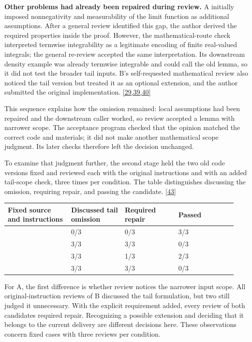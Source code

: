 \textbf{Other problems had already been repaired during review.} A initially imposed nonnegativity and measurability of the limit function as additional assumptions. After a general review identified this gap, the author derived the required properties inside the proof. However, the mathematical-route check interpreted termwise integrability as a legitimate encoding of finite real-valued integrals; the general re-review accepted the same interpretation. Its downstream density example was already termwise integrable and could call the old lemma, so it did not test the broader tail inputs. B's self-requested mathematical review also noticed the tail version but treated it as an optional extension, and the author submitted the original implementation. \hyperlink{ref-29}{\mbox{[29,39,40]}}

This sequence explains how the omission remained: local assumptions had been repaired and the downstream caller worked, so review accepted a lemma with narrower scope. The acceptance program checked that the opinion matched the correct code and materials; it did not make another mathematical scope judgment. Its later checks therefore left the decision unchanged.

To examine that judgment further, the second stage held the two old code versions fixed and reviewed each with the original instructions and with an added tail-scope check, three times per condition. The table distinguishes discussing the omission, requiring repair, and passing the candidate. \hyperlink{ref-43}{\mbox{[43]}}

\begingroup\small\setlength{\tabcolsep}{3pt}\renewcommand{\arraystretch}{1.14}
\par\nopagebreak\medskip\noindent\begin{minipage}[t]{\linewidth}
\begin{tabular}{>{\raggedright\arraybackslash}p{0.26\linewidth}>{\raggedright\arraybackslash}p{0.22\linewidth}>{\raggedright\arraybackslash}p{0.22\linewidth}>{\raggedright\arraybackslash}p{0.24\linewidth}}
\toprule
\textbf{Fixed source and instructions} & \textbf{Discussed tail omission} & \textbf{Required repair} & \textbf{Passed}\\\midrule

{A, original instructions} & {0/3} & {0/3} & {3/3}\\
{A, added scope check} & {3/3} & {3/3} & {0/3}\\
{B, original instructions} & {3/3} & {1/3} & {2/3}\\
{B, added scope check} & {3/3} & {3/3} & {0/3}\\
\bottomrule\end{tabular}\end{minipage}\par\medskip\endgroup
For A, the first difference is whether review notices the narrower input scope. All original-instruction reviews of B discussed the tail formulation, but two still judged it unnecessary. With the explicit requirement added, every review of both candidates required repair. Recognizing a possible extension and deciding that it belongs to the current delivery are different decisions here. These observations concern fixed cases with three reviews per condition.

